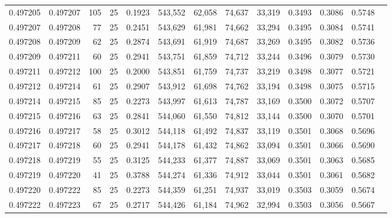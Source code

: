 \begin{tabular}{rrrrrrrrrrrrr}
0.497205 & 0.497207 &   105 &  25 &                                     0.1923 & 543,552 &  62,058 &  74,637 &  33,319 & 0.3493 & 0.3086 & 0.5748 \\
0.497207 & 0.497208 &    77 &  25 &                                     0.2451 & 543,629 &  61,981 &  74,662 &  33,294 & 0.3495 & 0.3084 & 0.5741 \\
0.497208 & 0.497209 &    62 &  25 &                                     0.2874 & 543,691 &  61,919 &  74,687 &  33,269 & 0.3495 & 0.3082 & 0.5736 \\
0.497209 & 0.497211 &    60 &  25 &                                     0.2941 & 543,751 &  61,859 &  74,712 &  33,244 & 0.3496 & 0.3079 & 0.5730 \\
0.497211 & 0.497212 &   100 &  25 &                                     0.2000 & 543,851 &  61,759 &  74,737 &  33,219 & 0.3498 & 0.3077 & 0.5721 \\
0.497212 & 0.497214 &    61 &  25 &                                     0.2907 & 543,912 &  61,698 &  74,762 &  33,194 & 0.3498 & 0.3075 & 0.5715 \\
0.497214 & 0.497215 &    85 &  25 &                                     0.2273 & 543,997 &  61,613 &  74,787 &  33,169 & 0.3500 & 0.3072 & 0.5707 \\
0.497215 & 0.497216 &    63 &  25 &                                     0.2841 & 544,060 &  61,550 &  74,812 &  33,144 & 0.3500 & 0.3070 & 0.5701 \\
0.497216 & 0.497217 &    58 &  25 &                                     0.3012 & 544,118 &  61,492 &  74,837 &  33,119 & 0.3501 & 0.3068 & 0.5696 \\
0.497217 & 0.497218 &    60 &  25 &                                     0.2941 & 544,178 &  61,432 &  74,862 &  33,094 & 0.3501 & 0.3066 & 0.5690 \\
0.497218 & 0.497219 &    55 &  25 &                                     0.3125 & 544,233 &  61,377 &  74,887 &  33,069 & 0.3501 & 0.3063 & 0.5685 \\
0.497219 & 0.497220 &    41 &  25 &                                     0.3788 & 544,274 &  61,336 &  74,912 &  33,044 & 0.3501 & 0.3061 & 0.5682 \\
0.497220 & 0.497222 &    85 &  25 &                                     0.2273 & 544,359 &  61,251 &  74,937 &  33,019 & 0.3503 & 0.3059 & 0.5674 \\
0.497222 & 0.497223 &    67 &  25 &                                     0.2717 & 544,426 &  61,184 &  74,962 &  32,994 & 0.3503 & 0.3056 & 0.5667 \\

\end{tabular}
